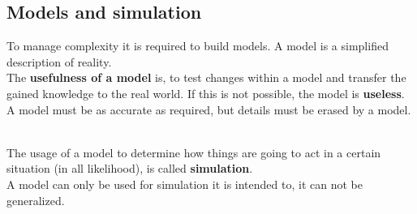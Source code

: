 \hypertarget{models-and-simulation}{%
\subsection{Models and simulation}\label{models-and-simulation}}

To manage complexity it is required to build models. A model is a
simplified description of reality.\\
The \textbf{usefulness of a model} is, to test changes within a model and
transfer the gained knowledge to the real world. If this is not
possible, the model is \textbf{useless}.\\
A model must be as accurate as required, but details must be erased by a model.

\mbox{}\\
The usage of a model to determine how things are going to act in a
certain situation (in all likelihood), is called \textbf{simulation}.\\
A model can only be used for simulation it is intended to, it can not be generalized.

